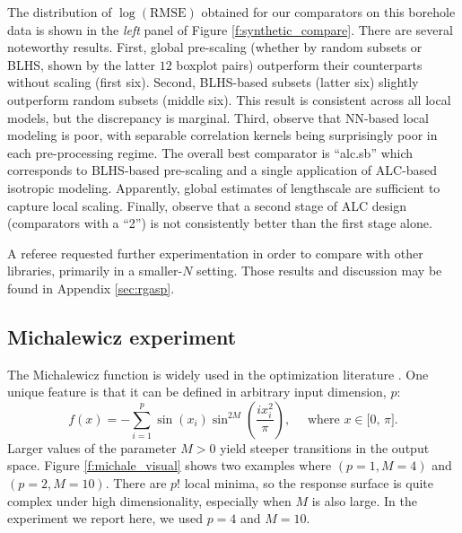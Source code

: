 \documentclass[12pt]{article}
\begin{document}
The distribution of $\log(\mathrm{RMSE})$ obtained for our comparators on this
borehole data is shown in the {\em left} panel of Figure
\ref{f:synthetic_compare}. There are several noteworthy results.  First,
global pre-scaling (whether by random subsets or BLHS, shown by the latter
$12$ boxplot pairs) outperform their counterparts without scaling (first six).
Second, BLHS-based subsets (latter six) slightly outperform random subsets
(middle six).  This result is consistent across all local models, but the
discrepancy is marginal. Third, observe that NN-based local modeling is poor,
with separable correlation kernels being surprisingly poor in each
pre-processing regime. The overall best comparator is ``alc.sb'' which
corresponds to BLHS-based pre-scaling and a single application of ALC-based
isotropic modeling. Apparently, global estimates of lengthscale are sufficient
to capture local scaling.
Finally, observe that a second stage of ALC design (comparators with a ``2'')
is not consistently better than the first stage alone.  

A referee requested further experimentation in order to compare with other
libraries, primarily in a smaller-$N$ setting.  Those results and discussion
may be found in Appendix \ref{sec:rgasp}.

\subsection{Michalewicz experiment}
\label{sec:michalewicz}

The Michalewicz function is widely used in the optimization literature
\citep{molga:smutnicki:2005}.  One unique feature is that it can be defined
in arbitrary input dimension, $p$:
$$
f(x)=-\sum_{i=1}^{p}\sin(x_i)\sin^{2M}\left(\frac{ix_i^2}{\pi}\right), 
\quad \mbox{ where } x \in \mbox{[0, $\pi$]}.
$$
Larger values of the parameter $M > 0$ yield steeper transitions in the output
space.  Figure \ref{f:michale_visual} shows two examples where $(p=1,M=4)$ and
$(p=2,M=10)$. There are $p!$ local minima, so the response surface is quite
complex under high dimensionality, especially when $M$ is also large.  In the
experiment we report here, we used $p=4$ and $M=10$.
\end{document}
